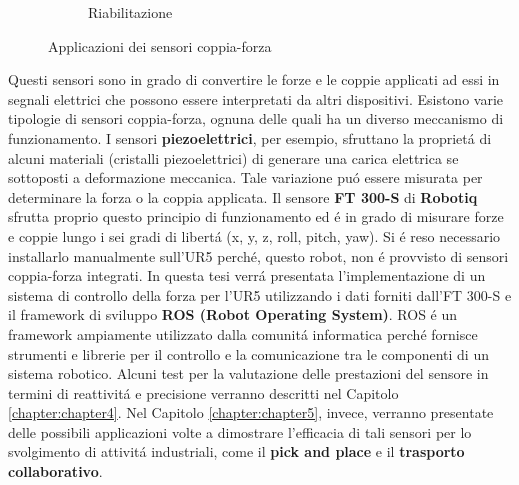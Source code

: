 \begin{figure}[H]
\begin{subfigure}[b]{0.3\textwidth}
        \caption{Riabilitazione}
        \label{fig:rehab}
    \end{subfigure}
    \caption{Applicazioni dei sensori coppia-forza}\label{fig:indutrial_applications}
\end{figure}
Questi sensori sono in grado di convertire le forze e le coppie applicati ad essi in segnali elettrici che possono essere 
interpretati da altri dispositivi. 
Esistono varie tipologie di sensori coppia-forza, ognuna delle quali ha un diverso meccanismo di funzionamento. 
I sensori \textbf{piezoelettrici}, per esempio, sfruttano la propriet\'{a} di alcuni materiali (cristalli piezoelettrici) 
di generare una carica elettrica se sottoposti a deformazione meccanica. Tale variazione  
pu\'{o} essere misurata per determinare la forza o la coppia applicata.
Il sensore \textbf{FT 300-S} di \textbf{Robotiq} sfrutta proprio questo principio di funzionamento ed \'{e} in grado di misurare 
forze e coppie lungo i sei gradi di libert\'{a} (x, y, z, roll, pitch, yaw). 
Si \'{e} reso necessario installarlo manualmente sull'UR5 perch\'{e}, questo robot, non \'{e} provvisto di sensori 
coppia-forza integrati. 
In questa tesi verr\'{a} presentata l'implementazione di un sistema di controllo della forza per l'UR5 utilizzando i dati
forniti dall'FT 300-S e il framework di sviluppo \textbf{ROS (Robot Operating System)}.
ROS \'{e} un framework ampiamente utilizzato dalla comunit\'{a} informatica perch\'{e} fornisce strumenti e librerie 
per il controllo e la comunicazione tra le componenti di un sistema robotico.
Alcuni test per la valutazione delle prestazioni del sensore in termini di reattivit\'{a} e precisione verranno descritti nel Capitolo 
\ref{chapter:chapter4}.
Nel Capitolo \ref{chapter:chapter5}, invece, verranno presentate delle possibili applicazioni volte a dimostrare l'efficacia
di tali sensori per lo svolgimento di attivit\'{a} industriali, come il \textbf{pick and place} e il \textbf{trasporto collaborativo}.
